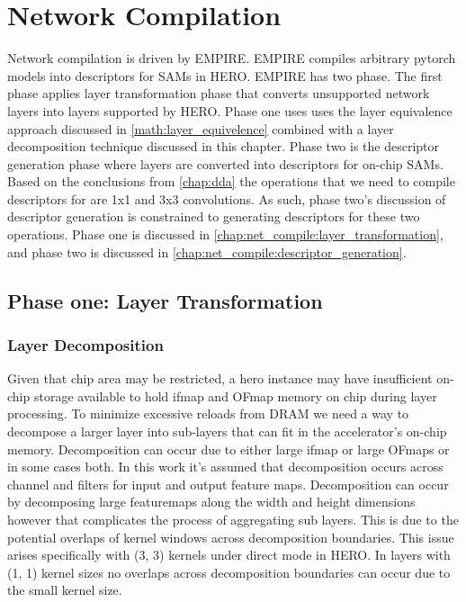 \chapter{Network Compilation}
\label{chap:net_compile}

Network compilation is driven by \ac{EMPIRE}. \ac{EMPIRE} compiles arbitrary
pytorch models into descriptors for SAMs in HERO. \ac{EMPIRE} has two phase. The
first phase applies
layer transformation phase that converts unsupported network layers into
layers supported by HERO. Phase one uses uses the layer equivalence approach discussed in
\autoref{math:layer_equivelence} combined with a layer decomposition technique
discussed in this chapter. Phase two is the descriptor generation phase where
layers are converted into descriptors for on-chip SAMs. Based on the conclusions
from \autoref{chap:dda} the operations that we need to compile descriptors for
are 1x1 and 3x3 convolutions. As such, phase two's discussion of descriptor
generation is constrained to generating descriptors for these two operations.
Phase one is discussed in \autoref{chap:net_compile:layer_transformation}, and
phase two is discussed in \autoref{chap:net_compile:descriptor_generation}.

\section{Phase one: Layer Transformation}
\label{chap:net_compile:layer_transformation}

\subsection{Layer Decomposition}
\label{chap:net_compile:layer_decomposition}

Given that chip area may be restricted, a hero instance may have
insufficient on-chip storage available to hold ifmap and OFmap memory on chip
during layer processing. To minimize excessive reloads from DRAM we need a way to decompose a
larger layer into sub-layers that can fit in the accelerator's on-chip memory.
Decomposition can occur due to either large ifmap or large OFmaps or in some cases
both. In this work it's assumed that decomposition occurs across channel and
filters for input and output feature maps. Decomposition can occur by
decomposing large featuremaps along the width and height dimensions however that
complicates the process of aggregating sub layers. This is due to the potential overlaps
of kernel windows across decomposition boundaries. This issue arises
specifically with (3, 3) kernels under direct mode in HERO. In layers with (1,
1) kernel sizes no overlaps across decomposition boundaries can occur due to
the small kernel size. 

